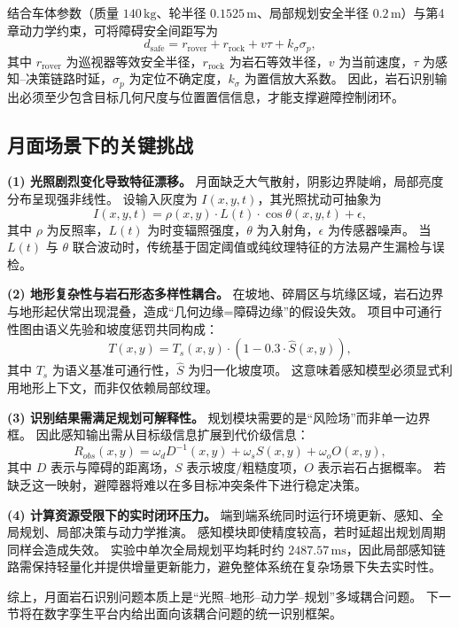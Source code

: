 结合车体参数（质量 $140\,\mathrm{kg}$、轮半径 $0.1525\,\mathrm{m}$、局部规划安全半径 $0.2\,\mathrm{m}$）与第4章动力学约束，可将障碍安全间距写为
\begin{equation}
d_{\mathrm{safe}}=r_{\mathrm{rover}}+r_{\mathrm{rock}}+v\tau+k_\sigma \sigma_p,
\label{eq:ch5_safe_distance_base}
\end{equation}
其中 $r_{\mathrm{rover}}$ 为巡视器等效安全半径，$r_{\mathrm{rock}}$ 为岩石等效半径，$v$ 为当前速度，$\tau$ 为感知--决策链路时延，$\sigma_p$ 为定位不确定度，$k_\sigma$ 为置信放大系数。
因此，岩石识别输出必须至少包含目标几何尺度与位置置信信息，才能支撑避障控制闭环。

\subsection{月面场景下的关键挑战}

\textbf{(1) 光照剧烈变化导致特征漂移。}
月面缺乏大气散射，阴影边界陡峭，局部亮度分布呈现强非线性。
设输入灰度为 $I(x,y,t)$，其光照扰动可抽象为
\begin{equation}
I(x,y,t)=\rho(x,y)\cdot L(t)\cdot \cos\theta(x,y,t)+\epsilon,
\label{eq:ch5_lighting}
\end{equation}
其中 $\rho$ 为反照率，$L(t)$ 为时变辐照强度，$\theta$ 为入射角，$\epsilon$ 为传感器噪声。
当 $L(t)$ 与 $\theta$ 联合波动时，传统基于固定阈值或纯纹理特征的方法易产生漏检与误检。

\textbf{(2) 地形复杂性与岩石形态多样性耦合。}
在坡地、碎屑区与坑缘区域，岩石边界与地形起伏常出现混叠，造成“几何边缘=障碍边缘”的假设失效。
项目中可通行性图由语义先验和坡度惩罚共同构成：
\begin{equation}
T(x,y)=T_s(x,y)\cdot \left(1-0.3\cdot \hat{S}(x,y)\right),
\label{eq:ch5_traversability}
\end{equation}
其中 $T_s$ 为语义基准可通行性，$\hat{S}$ 为归一化坡度项。
这意味着感知模型必须显式利用地形上下文，而非仅依赖局部纹理。

\textbf{(3) 识别结果需满足规划可解释性。}
规划模块需要的是“风险场”而非单一边界框。
因此感知输出需从目标级信息扩展到代价级信息：
\begin{equation}
R_{obs}(x,y)=\omega_d D^{-1}(x,y)+\omega_s S(x,y)+\omega_o O(x,y),
\label{eq:ch5_risk_field}
\end{equation}
其中 $D$ 表示与障碍的距离场，$S$ 表示坡度/粗糙度项，$O$ 表示岩石占据概率。
若缺乏这一映射，避障器将难以在多目标冲突条件下进行稳定决策。

\textbf{(4) 计算资源受限下的实时闭环压力。}
端到端系统同时运行环境更新、感知、全局规划、局部决策与动力学推演。
感知模块即使精度较高，若时延超出规划周期同样会造成失效。
实验中单次全局规划平均耗时约 $2487.57\,\mathrm{ms}$，因此局部感知链路需保持轻量化并提供增量更新能力，避免整体系统在复杂场景下失去实时性。

综上，月面岩石识别问题本质上是“光照--地形--动力学--规划”多域耦合问题。
下一节将在数字孪生平台内给出面向该耦合问题的统一识别框架。
